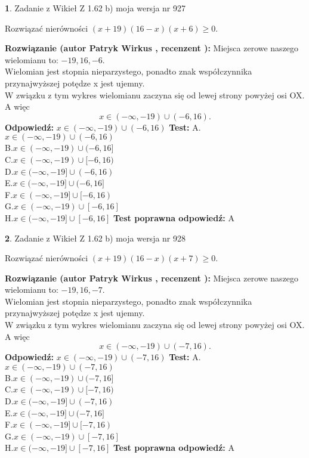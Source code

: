 \documentclass[12pt, a4paper]{article}
\theoremstyle{definition} %
\newtheorem{zad}{}
\newcommand{\zadStart}[1]{\begin{zad}#1\newline}
\newcommand{\zadStop}{\end{zad}}
\newcommand{\rozwStart}[2]{\noindent \textbf{Rozwiązanie (autor #1 , recenzent #2): }\newline}
\newcommand{\rozwStop}{\newline}
\newcommand{\odpStart}{\noindent \textbf{Odpowiedź:}\newline}
\newcommand{\odpStop}{\newline}
\newcommand{\testStart}{\noindent \textbf{Test:}\newline}
\newcommand{\testStop}{\newline}
\newcommand{\kluczStart}{\noindent \textbf{Test poprawna odpowiedź:}\newline}
\newcommand{\kluczStop}{\newline}
\begin{document}
\zadStart{Zadanie z Wikieł Z 1.62 b) moja wersja nr 927}

Rozwiązać nierówności $(x+19)(16-x)(x+6)\ge0$.
\zadStop
\rozwStart{Patryk Wirkus}{}
Miejsca zerowe naszego wielomianu to: $-19, 16, -6$.\\
Wielomian jest stopnia nieparzystego, ponadto znak współczynnika przy\linebreak najwyższej potędze x jest ujemny.\\ W związku z tym wykres wielomianu zaczyna się od lewej strony powyżej osi OX. A więc $$x \in (-\infty,-19) \cup (-6,16).$$
\rozwStop
\odpStart
$x \in (-\infty,-19) \cup (-6,16)$
\odpStop
\testStart
A.$x \in (-\infty,-19) \cup (-6,16)$\\
B.$x \in (-\infty,-19) \cup (-6,16]$\\
C.$x \in (-\infty,-19) \cup [-6,16)$\\
D.$x \in (-\infty,-19] \cup (-6,16)$\\
E.$x \in (-\infty,-19] \cup (-6,16]$\\
F.$x \in (-\infty,-19] \cup [-6,16)$\\
G.$x \in (-\infty,-19) \cup [-6,16]$\\
H.$x \in (-\infty,-19] \cup [-6,16]$
\testStop
\kluczStart
A
\kluczStop



\zadStart{Zadanie z Wikieł Z 1.62 b) moja wersja nr 928}

Rozwiązać nierówności $(x+19)(16-x)(x+7)\ge0$.
\zadStop
\rozwStart{Patryk Wirkus}{}
Miejsca zerowe naszego wielomianu to: $-19, 16, -7$.\\
Wielomian jest stopnia nieparzystego, ponadto znak współczynnika przy\linebreak najwyższej potędze x jest ujemny.\\ W związku z tym wykres wielomianu zaczyna się od lewej strony powyżej osi OX. A więc $$x \in (-\infty,-19) \cup (-7,16).$$
\rozwStop
\odpStart
$x \in (-\infty,-19) \cup (-7,16)$
\odpStop
\testStart
A.$x \in (-\infty,-19) \cup (-7,16)$\\
B.$x \in (-\infty,-19) \cup (-7,16]$\\
C.$x \in (-\infty,-19) \cup [-7,16)$\\
D.$x \in (-\infty,-19] \cup (-7,16)$\\
E.$x \in (-\infty,-19] \cup (-7,16]$\\
F.$x \in (-\infty,-19] \cup [-7,16)$\\
G.$x \in (-\infty,-19) \cup [-7,16]$\\
H.$x \in (-\infty,-19] \cup [-7,16]$
\testStop
\kluczStart
A
\kluczStop
\end{document}
